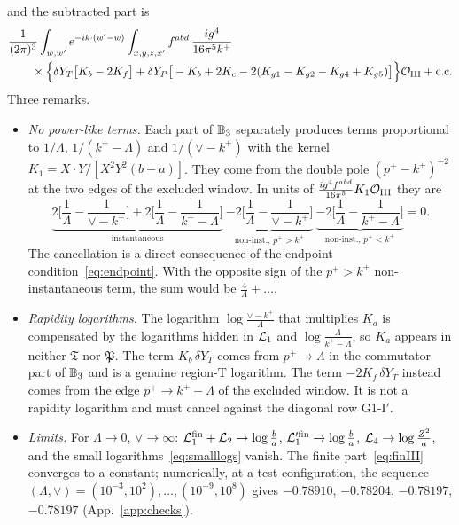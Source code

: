 and the subtracted part is
\begin{align}
&\frac{1}{(2\pi)^3}\int_{w,w'}e^{-ik\cdot(w'-w)}\int_{x,y,z,x'}f^{abd}\,\frac{ig^4}{16\pi^5k^+}\notag\\
&\qquad\times\Big\{\delta Y_T\big[K_b-2K_f\big]+\delta Y_P\big[-K_b+2K_c-2(K_{g1}-K_{g2}-K_{g4}+K_{g5})\big]\Big\}\mathcal{O}_{\rm III}+{\rm c.c.}
\label{eq:LLIII}
\end{align}
Three remarks.
\begin{itemize}
\item \emph{No power-like terms.} Each part of $\mathbb{B}_3$ separately produces terms proportional to $1/\Lambda$, $1/(k^+-\Lambda)$ and $1/(\vee-k^+)$ with the kernel $K_1=X\cdot Y/[X^2Y^2(b-a)]$. They come from the double pole $(p^+-k^+)^{-2}$ at the two edges of the excluded window. In units of $\frac{ig^4f^{abd}}{16\pi^5}K_1\mathcal{O}_{\rm III}$ they are
\begin{equation}
\underbrace{2\Big[\frac1\Lambda-\frac{1}{\vee-k^+}\Big]+2\Big[\frac1\Lambda-\frac{1}{k^+-\Lambda}\Big]}_{\text{instantaneous}}\ \underbrace{-2\Big[\frac1\Lambda-\frac{1}{\vee-k^+}\Big]}_{\text{non-inst., }p^+>k^+}\ \underbrace{-2\Big[\frac1\Lambda-\frac{1}{k^+-\Lambda}\Big]}_{\text{non-inst., }p^+<k^+}=0 .
\label{eq:powercancel}
\end{equation}
The cancellation is a direct consequence of the endpoint condition~\eqref{eq:endpoint}. With the opposite sign of the $p^+>k^+$ non-instantaneous term, the sum would be $\frac{4}{\Lambda}+\dots$.
\item \emph{Rapidity logarithms.} The logarithm $\log\frac{\vee-k^+}{\Lambda}$ that multiplies $K_a$ is compensated by the logarithms hidden in $\mathcal{L}_{1}$ and $\log\frac{\Lambda}{k^+-\Lambda}$, so $K_a$ appears in neither $\mathfrak T$ nor $\mathfrak P$. The term $K_b\,\delta Y_T$ comes from $p^+\to\Lambda$ in the commutator part of $\mathbb{B}_3$ and is a genuine region-T logarithm. The term $-2K_f\,\delta Y_T$ instead comes from the edge $p^+\to k^+-\Lambda$ of the excluded window. It is not a rapidity logarithm and must cancel against the diagonal row G1-I$'$.
\item \emph{Limits.} For $\Lambda\to0$, $\vee\to\infty$: $\mathcal{L}_{1}^{\rm fin}+\mathcal{L}_{2}\to\log\frac{b}{a}$, $\mathcal{L}_{1}'^{\rm fin}\to\log\frac ba$, $\mathcal{L}_{4}\to\log\frac{Z^2}{a}$, and the small logarithms~\eqref{eq:smalllogs} vanish. The finite part~\eqref{eq:finIII} converges to a constant; numerically, at a test configuration, the sequence $(\Lambda,\vee)=(10^{-3},10^2),\dots,(10^{-9},10^8)$ gives $-0.78910$, $-0.78204$, $-0.78197$, $-0.78197$ (App.~\ref{app:checks}).
\end{itemize}

